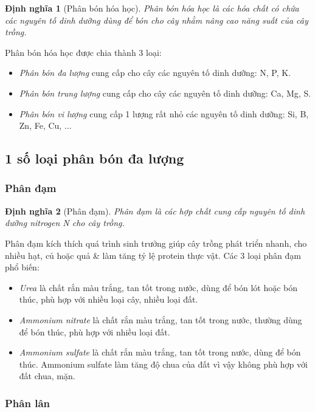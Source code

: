 \documentclass{article}
\newtheorem{dinhnghia}{Định nghĩa}
\begin{document}
\begin{dinhnghia}[Phân bón hóa học]
	{\rm Phân bón hóa học} là các hóa chất có chứa các nguyên tố dinh dưỡng dùng để bón cho cây nhằm nâng cao năng suất của cây trồng.
\end{dinhnghia}
Phân bón hóa học được chia thành 3 loại:
\begin{itemize}
	\item \textit{Phân bón đa lượng} cung cấp cho cây các nguyên tố dinh dưỡng: N, P, K.
	\item \textit{Phân bón trung lượng} cung cấp cho cây các nguyên tố dinh dưỡng: Ca, Mg, S.
	\item \textit{Phân bón vi lượng} cung cấp 1 lượng rất nhỏ các nguyên tố dinh dưỡng: Si, B, Zn, Fe, Cu, $\ldots$
\end{itemize}

\subsection{1 số loại phân bón đa lượng}

\subsubsection{Phân đạm}

\begin{dinhnghia}[Phân đạm]
	{\rm Phân đạm} là các hợp chất cung cấp nguyên tố dinh dưỡng nitrogen {\rm N} cho cây trồng.
\end{dinhnghia}
Phân đạm kích thích quá trình sinh trưởng giúp cây trồng phát triển nhanh, cho nhiều hạt, củ hoặc quả \& làm tăng tỷ lệ protein thực vật. Các 3 loại phân đạm phổ biến:
\begin{itemize}
	\item \textit{Urea}  là chất rắn màu trắng, tan tốt trong nước, dùng để bón lót hoặc bón thúc, phù hợp với nhiều loại cây, nhiều loại đất.
	\item \textit{Ammonium nitrate}  là chất rắn màu trắng, tan tốt trong nước, thường dùng để bón thúc, phù hợp với nhiều loại đất.
	\item \textit{Ammonium sulfate}  là chất rắn màu trắng, tan tốt trong nước, dùng để bón thúc. Ammonium sulfate làm tăng độ chua của đất vì vậy không phù hợp với đất chua, mặn.
\end{itemize}

\subsubsection{Phân lân}
\end{document}

